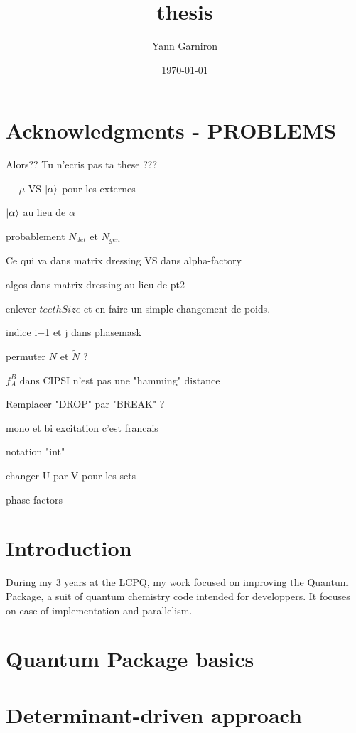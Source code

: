 \documentclass[12pt,a4paper]{report}
\title{thesis}
\author{Yann Garniron}
\date{\today}
\begin{document}
\dominitoc

\maketitle
\newpage

\chapter*{Acknowledgments - PROBLEMS}



Alors?? Tu n'ecris pas ta these ???


----$\mu$ VS $\ket \alpha$ pour les externes

$\ket \alpha$ au lieu de $\alpha$

probablement $N_{det}$ et $N_{gen}$

Ce qui va dans matrix dressing VS dans alpha-factory

algos dans matrix dressing au lieu de pt2

enlever $teethSize$ et en faire un simple changement de poids.

indice i+1 et j dans phasemask

permuter $N$ et $\tilde N$ ?

$f_A^B$ dans CIPSI n'est pas une "hamming" distance

Remplacer "DROP" par "BREAK" ?

mono et bi excitation c'est francais

notation "int"

changer U par V pour les sets

phase factors

\newpage

\tableofcontents
\newpage


\chapter{Introduction}

During my 3 years at the LCPQ, my work focused on improving the Quantum Package, a suit of quantum chemistry code intended for developpers. It focuses on ease of implementation and parallelism.

\chapter{Quantum Package basics}
\minitoc



\chapter{Determinant-driven approach}
\minitoc

\end{document}
